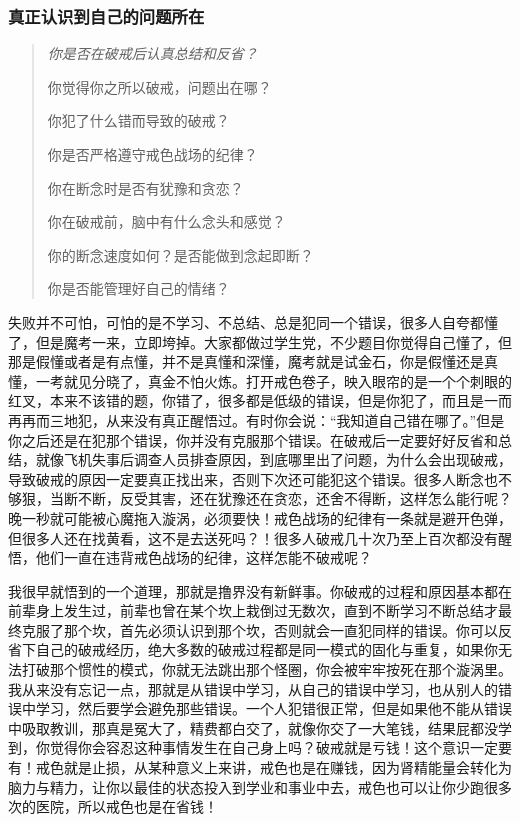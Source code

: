 \subsubsection{真正认识到自己的问题所在}

\begin{quotation}\it
    你是否在破戒后认真总结和反省？

    你觉得你之所以破戒，问题出在哪？

    你犯了什么错而导致的破戒？

    你是否严格遵守戒色战场的纪律？

    你在断念时是否有犹豫和贪恋？

    你在破戒前，脑中有什么念头和感觉？

    你的断念速度如何？是否能做到念起即断？

    你是否能管理好自己的情绪？
\end{quotation}

失败并不可怕，可怕的是不学习、不总结、总是犯同一个错误，很多人自夸都懂了，但是魔考一来，立即垮掉。大家都做过学生党，不少题目你觉得自己懂了，但那是假懂或者是有点懂，并不是真懂和深懂，魔考就是试金石，你是假懂还是真懂，一考就见分晓了，真金不怕火炼。打开戒色卷子，映入眼帘的是一个个刺眼的红叉，本来不该错的题，你错了，很多都是低级的错误，但是你犯了，而且是一而再再而三地犯，从来没有真正醒悟过。有时你会说：“我知道自己错在哪了。”但是你之后还是在犯那个错误，你并没有克服那个错误。在破戒后一定要好好反省和总结，就像飞机失事后调查人员排查原因，到底哪里出了问题，为什么会出现破戒，导致破戒的原因一定要真正找出来，否则下次还可能犯这个错误。很多人断念也不够狠，当断不断，反受其害，还在犹豫还在贪恋，还舍不得断，这样怎么能行呢？晚一秒就可能被心魔拖入漩涡，必须要快！戒色战场的纪律有一条就是避开色弹，但很多人还在找黄看，这不是去送死吗？！很多人破戒几十次乃至上百次都没有醒悟，他们一直在违背戒色战场的纪律，这样怎能不破戒呢？

我很早就悟到的一个道理，那就是撸界没有新鲜事。你破戒的过程和原因基本都在前辈身上发生过，前辈也曾在某个坎上栽倒过无数次，直到不断学习不断总结才最终克服了那个坎，首先必须认识到那个坎，否则就会一直犯同样的错误。你可以反省下自己的破戒经历，绝大多数的破戒过程都是同一模式的固化与重复，如果你无法打破那个惯性的模式，你就无法跳出那个怪圈，你会被牢牢按死在那个漩涡里。我从来没有忘记一点，那就是从错误中学习，从自己的错误中学习，也从别人的错误中学习，然后要学会避免那些错误。一个人犯错很正常，但是如果他不能从错误中吸取教训，那真是冤大了，精费都白交了，就像你交了一大笔钱，结果屁都没学到，你觉得你会容忍这种事情发生在自己身上吗？破戒就是亏钱！这个意识一定要有！戒色就是止损，从某种意义上来讲，戒色也是在赚钱，因为肾精能量会转化为脑力与精力，让你以最佳的状态投入到学业和事业中去，戒色也可以让你少跑很多次的医院，所以戒色也是在省钱！

